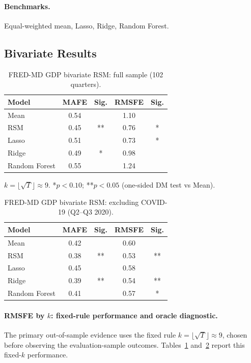 \documentclass[12pt,a4paper]{article}
\theoremstyle{definition}
\begin{document}
\paragraph{Benchmarks.} Equal-weighted mean, Lasso, Ridge, Random Forest.

\subsection{Bivariate Results}

\begin{table}[ht]
\centering
\caption{FRED-MD GDP bivariate RSM: full sample (102 quarters).}
\label{tab:gdp_biv_full}
\begin{tabular}{lcccc}
\toprule
Model & MAFE & Sig. & RMSFE & Sig. \\
\midrule
Mean           & 0.54 &     & 1.10 &    \\
RSM            & 0.45 & **  & 0.76 & *  \\
Lasso          & 0.51 &     & 0.73 & *  \\
Ridge          & 0.49 & *   & 0.98 &    \\
Random Forest  & 0.55 &     & 1.24 &    \\
\bottomrule
\end{tabular}
\footnotesize{$k=\lfloor\sqrt{T}\rfloor\approx9$. *$p<0.10$; **$p<0.05$ (one-sided DM test vs Mean).}
\end{table}

\begin{table}[ht]
\centering
\caption{FRED-MD GDP bivariate RSM: excluding COVID-19 (Q2--Q3 2020).}
\label{tab:gdp_biv_nocov}
\begin{tabular}{lcccc}
\toprule
Model & MAFE & Sig. & RMSFE & Sig. \\
\midrule
Mean           & 0.42 &     & 0.60 &     \\
RSM            & 0.38 & **  & 0.53 & **  \\
Lasso          & 0.45 &     & 0.58 &     \\
Ridge          & 0.39 & **  & 0.54 & **  \\
Random Forest  & 0.41 &     & 0.57 & *   \\
\bottomrule
\end{tabular}
\end{table}

\paragraph{RMSFE by $k$: fixed-rule performance and oracle diagnostic.}
The primary out-of-sample evidence uses the fixed rule $k=\lfloor\sqrt{T}\rfloor\approx9$,
chosen before observing the evaluation-sample outcomes. Tables~\ref{tab:gdp_biv_full}
and~\ref{tab:gdp_biv_nocov} report this fixed-$k$ performance.
\end{document}
